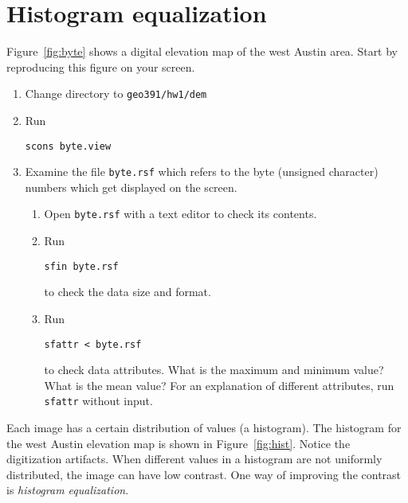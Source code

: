 \lstset{language=python,numbers=left,numberstyle=\tiny,showstringspaces=false}


\section{Histogram equalization}


Figure~\ref{fig:byte} shows a digital elevation map of the west Austin
area. Start by reproducing this figure on your screen.
\begin{enumerate}
\item Change directory to \verb#geo391/hw1/dem#
\item Run
\begin{verbatim}
scons byte.view
\end{verbatim}
\item Examine the file \texttt{byte.rsf} which refers to the 
byte (unsigned character) numbers which get displayed on the screen.
\begin{enumerate}
\item Open \texttt{byte.rsf} with a text editor to check its contents.
\item Run
\begin{verbatim}
sfin byte.rsf
\end{verbatim}
to check the data size and format.
\item Run
\begin{verbatim}
sfattr < byte.rsf
\end{verbatim}
to check data attributes. What is the maximum and minimum value? What
is the mean value? For an explanation of different attributes,
run \texttt{sfattr} without input.
\end{enumerate}
\end{enumerate}

Each image has a certain distribution of values (a histogram). The
histogram for the west Austin elevation map is shown in
Figure~\ref{fig:hist}. Notice the digitization artifacts. When
different values in a histogram are not uniformly distributed, the
image can have low contrast. One way of improving the contrast is
\emph{histogram equalization}.


